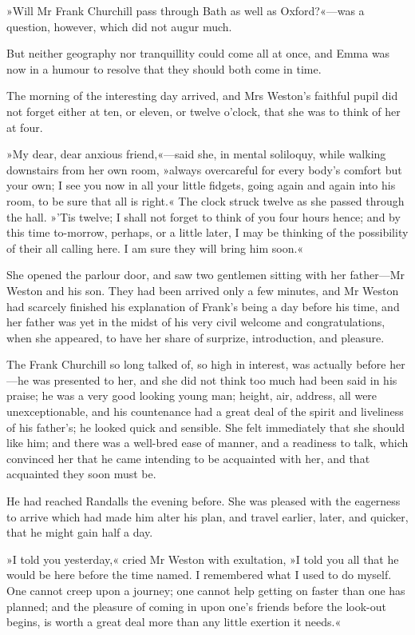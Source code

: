 »Will Mr Frank Churchill pass through Bath as well as Oxford?«—was a question, however, which did not augur much.

But neither geography nor tranquillity could come all at once, and Emma was now in a humour to resolve that they should both come in time.

The morning of the interesting day arrived, and Mrs Weston's faithful pupil did not forget either at ten, or eleven, or twelve o'clock, that she was to think of her at four.

»My dear, dear anxious friend,«—said she, in mental soliloquy, while walking downstairs from her own room, »always overcareful for every body's comfort but your own; I see you now in all your little fidgets, going again and again into his room, to be sure that all is right.« The clock struck twelve as she passed through the hall. »'Tis twelve; I shall not forget to think of you four hours hence; and by this time to-morrow, perhaps, or a little later, I may be thinking of the possibility of their all calling here. I am sure they will bring him soon.«

She opened the parlour door, and saw two gentlemen sitting with her father—Mr Weston and his son. They had been arrived only a few minutes, and Mr Weston had scarcely finished his explanation of Frank's being a day before his time, and her father was yet in the midst of his very civil welcome and congratulations, when she appeared, to have her share of surprize, introduction, and pleasure.

The Frank Churchill so long talked of, so high in interest, was actually before her—he was presented to her, and she did not think too much had been said in his praise; he was a very good looking young man; height, air, address, all were unexceptionable, and his countenance had a great deal of the spirit and liveliness of his father's; he looked quick and sensible. She felt immediately that she should like him; and there was a well-bred ease of manner, and a readiness to talk, which convinced her that he came intending to be acquainted with her, and that acquainted they soon must be.

He had reached Randalls the evening before. She was pleased with the eagerness to arrive which had made him alter his plan, and travel earlier, later, and quicker, that he might gain half a day.

»I told you yesterday,« cried Mr Weston with exultation, »I told you all that he would be here before the time named. I remembered what I used to do myself. One cannot creep upon a journey; one cannot help getting on faster than one has planned; and the pleasure of coming in upon one's friends before the look-out begins, is worth a great deal more than any little exertion it needs.«

